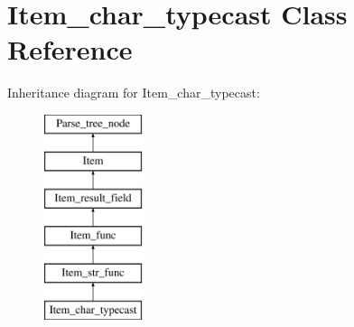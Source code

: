 \hypertarget{classItem__char__typecast}{}\section{Item\+\_\+char\+\_\+typecast Class Reference}
\label{classItem__char__typecast}
Inheritance diagram for Item\+\_\+char\+\_\+typecast\+:\begin{figure}[H]
\begin{center}
\leavevmode
\includegraphics[height=6.000000cm]{classItem__char__typecast}
\end{center}
\end{figure}
